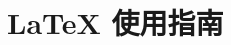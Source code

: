 \documentclass{ctexart}
\begin{document}
\tableofcontents %

\section{\texorpdfstring{\LaTeX}{LaTeX} 使用指南}

\end{document}

